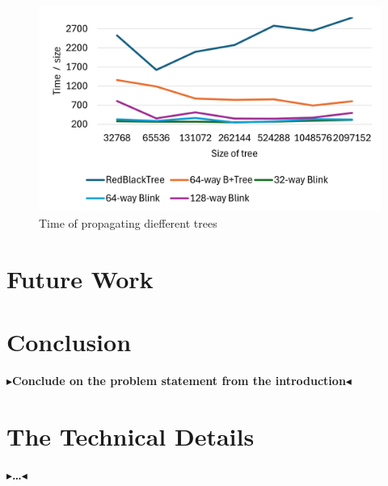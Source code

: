 \documentclass[twoside,11pt,openright]{report}
\theoremstyle{definition}
\newcommand{\todo}[1]{{\color[rgb]{.5,0,0}\textbf{$\blacktriangleright$#1$\blacktriangleleft$}}}
\begin{document}
\begin{figure}[htbp]
  \vspace{0.5cm}

  \begin{minipage}[b]{0.49\textwidth}
    \centering
    \includegraphics[width=\textwidth]{asset/insert2.png}
    \captionsetup{width=0.9\textwidth}
    \caption{Time of propagating diefferent trees}
    \label{fig:insert_blink}
  \end{minipage}
\end{figure}
\restoregeometry


\chapter{Future Work}
\label{ch:future_work}

\chapter{Conclusion}
\label{ch:conclusion}

\todo{Conclude on the problem statement from the introduction}


\cleardoublepage
{}




\cleardoublepage
\appendix
\chapter{The Technical Details}

\todo{\dots}
\end{document}
